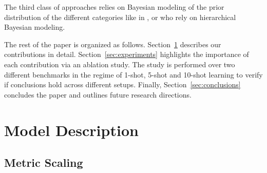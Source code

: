 \documentclass{article}
\begin{document}
The third class of approaches relies on Bayesian modeling of the prior distribution of the different categories like in \citet{fei2006one, Bauer2017discriminative}, or \citet{lake2013one, edwards2016towards, Lacoste2018deepprior} who rely on hierarchical Bayesian modeling.


The rest of the paper is organized as follows. Section~\ref{sec:model} describes our contributions in detail. Section~\ref{sec:experiments} highlights the importance of each contribution via an ablation study. The study is performed over two different benchmarks in the regime of 1-shot, 5-shot and 10-shot learning to verify if conclusions hold across different setups. Finally, Section~\ref{sec:conclusions} concludes the paper and outlines future research directions.

\section{Model Description}\label{sec:model}

\subsection{Metric Scaling}\label{ssec:theory_metric_scaling}
\end{document}
